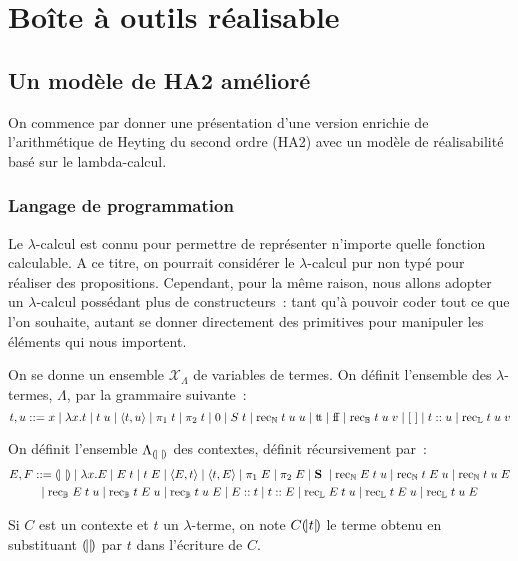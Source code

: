 \documentclass{article}
\begin{document}
\section{Boîte à outils réalisable}

\subsection{Un modèle de HA2 amélioré}

On commence par donner une présentation d'une version enrichie de l'arithmétique de Heyting du second ordre (HA2) avec un modèle de réalisabilité basé sur le lambda-calcul.

\subsubsection{Langage de programmation}

Le $\lambda$-calcul est connu pour permettre de représenter n'importe quelle fonction calculable. A ce titre, on pourrait considérer le $\lambda$-calcul pur non typé pour réaliser des propositions. Cependant, pour la même raison, nous allons adopter un $\lambda$-calcul possédant plus de constructeurs~: tant qu'à pouvoir coder tout ce que l'on souhaite, autant se donner directement des primitives pour manipuler les éléments qui nous importent.

\begin{defi}[$\Lambda$]
  On se donne un ensemble $\mathcal X_\Lambda$ de variables de termes. On définit l'ensemble des $\lambda$-termes, $\Lambda$, par la grammaire suivante~:
  \[t,u ::= x\mid\lambda x. t\mid t\;u\mid \langle t,u\rangle\mid \pi_1\;t\mid \pi_2\;t\mid 0\mid S\;t\mid \mathrm{rec}_{\mathbb{N}}\;t\;u\;u\mid \mathrm{t}\!\mathrm{t}\mid\mathrm{f}\!\mathrm{f}\mid\mathrm{rec}_{\mathbb{B}}\;t\;u\;v\mid [\;]\mid t:: u\mid \mathrm{rec}_{\mathbb{L}}\;t\;u\;v\]
\end{defi}

\begin{defi}[Contexte]
  On définit l'ensemble $\Lambda_{(\!| \;|\!)}$ des contextes, définit récursivement par~:
  \begin{multline*}
    E,F::= (\!| \ |\!)\mid \lambda x.E\mid E\;t\mid t\;E\mid \langle E,t\rangle\mid \langle t,E\rangle\mid \pi_1\;E\mid\pi_2\;E\mid\mathbf{S}\;\mid \mathrm{rec}_{\mathbb{N}}\;E\;t\;u\mid \mathrm{rec}_{\mathbb{N}}\;t\;E\;u\mid\mathrm{rec}_{\mathbb{N}}\;t\;u\;E\\\mid\mathrm{rec}_{\mathbb{B}}\;E\;t\;u\mid\mathrm{rec}_{\mathbb{B}}\;t\;E\;u\mid\mathrm{rec}_{\mathbb{B}}\;t\;u\;E\mid E::t\mid t::E\mid \mathrm{rec}_{\mathbb{L}}\;E\;t\;u\mid \mathrm{rec}_{\mathbb{L}}\;t\;E\;u\mid\mathrm{rec}_{\mathbb{L}}\;t\;u\;E
  \end{multline*}

  Si $C$ est un contexte et $t$ un $\lambda$-terme, on note $C(\!| t|\!)$ le terme obtenu en substituant $(\!| |\!)$ par $t$ dans l'écriture de $C$.
\end{defi}
\end{document}
